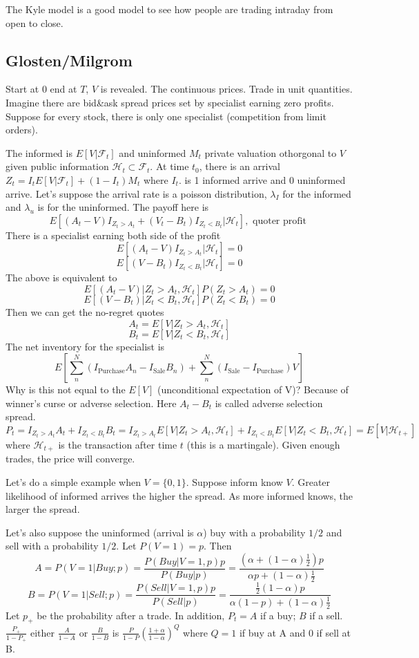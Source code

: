 \documentclass[11pt, a4paper, oneside]{article}
\theoremstyle{definition}
\theoremstyle{proposition}
\theoremstyle{corollary}
\theoremstyle{lemma}
\theoremstyle{theorem}
\begin{document}
The Kyle model is a good model to see how people are trading intraday from open to close. 

\subsection{Glosten/Milgrom}
Start at $0$ end at $T$, $V$ is revealed. The continuous prices. Trade in unit quantities. Imagine there are bid\&ask spread prices set by specialist earning zero profits. Suppose for every stock, there is only one specialist (competition from limit orders). 

The informed is $E[V|\mathcal{F}_t]$ and uninformed $M_t$ private valuation othorgonal to $V$ given public information $\mathcal{H}_t \subset \mathcal{F}_t$. At time $t_0$, there is an arrival $Z_t = I_tE[V|\mathcal{F}_t] + (1- I_t)M_t$ where $I_t.$ is 1 informed arrive and 0 uninformed arrive. Let's suppose the arrival rate is a poisson distribution, $\lambda_I$ for the informed and $\lambda_u$ is for the uninformed. The payoff here is
$$E[(A_t - V)I_{Z_t > A_t}+(V_t - B_t)I_{Z_t < B_t}|\mathcal{H}_t], \text{ quoter profit }$$
There is a specialist earning both side of the profit
$$E[(A_t - V)I_{Z_t > A_t}|\mathcal{H}_t] = 0$$
$$E[(V- B_t)I_{Z_t < B_t}|\mathcal{H}_t] = 0$$
The above is equivalent to 
$$E[(A_t - V)|Z_t >A_t, \mathcal{H}_t]P(Z_t > A_t) = 0$$
$$E[(V- B_t)|Z_t < B_t, \mathcal{H}_t]P(Z_t < B_t) = 0$$
Then we can get the no-regret quotes
$$A_t = E[V|Z_t >A_t, \mathcal{H}_t]$$
$$B_t = E[V|Z_t < B_t, \mathcal{H}_t]$$
 The net inventory for the specialist is
 $$E\left[\sum_n^N (I_{\text{Purchase}}A_n - I_{\text{Sale}}B_n) + \sum_n^N (I_{\text{Sale}} - I_{\text{Purchase}})V\right]$$
 Why is this not equal to the $E[V]$ (unconditional expectation of V)? Because of winner's curse or adverse selection. Here $A_t - B_t$ is called adverse selection spread. 
 $$P_t = I_{Z_t > A_t}A_t + I_{Z_t < B_t}B_t = I_{Z_t > A_t}E[V|Z_t > A_t, \mathcal{H}_t] + I_{Z_t < B_t}E[V|Z_t < B_t,  \mathcal{H}_t] = E[V|\mathcal{H}_{t+}]$$
where $\mathcal{H}_{t+}$ is the transaction after time $t$ (this is a martingale). Given enough trades, the price will converge. 

Let's do a simple example when $V= \{0, 1\}$. Suppose inform know $V$. Greater likelihood of informed arrives the higher the spread. As more informed knows, the larger the spread.

Let's also suppose the uninformed (arrival is $\alpha$) buy with a probability $1/2$ and sell with a probability $1/2$. Let $P(V=1)=p$. Then
$$A = P(V=1|Buy; p) = \frac{P(Buy|V=1, p)p}{P(Buy|p)} = \frac{\left(\alpha + (1- \alpha)\frac{1}{2}\right)p}{\alpha p + (1- \alpha) \frac{1}{2}}$$
$$B = P(V=1|Sell; p) = \frac{P(Sell|V=1, p)p}{P(Sell|p)} = \frac{\frac{1}{2}(1- \alpha) p}{\alpha(1- p) + ( 1- \alpha)\frac{1}{2}}$$
Let $p_+$ be the probability after a trade. In addition, $P_t = A$ if a buy; $B$ if a sell. $\frac{P_+}{1-P_+}$ either $\frac{A}{1- A}$ or $\frac{B}{1- B}$ is $\frac{P}{1-P}\left(\frac{1+\alpha}{1 - \alpha}\right)^Q$ where $Q = 1$ if buy at A and $0$ if sell at B. 
\end{document}
